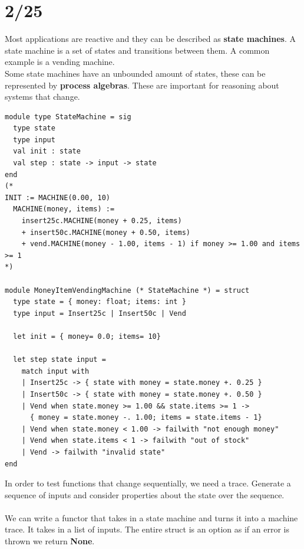 \section{2/25}
Most applications are reactive and they can be described as \textbf{state machines}. A state machine is a set of states and transitions between them. A common example is a vending machine.
\\
Some state machines have an unbounded amount of states, these can be represented by \textbf{process algebras}. These are important for reasoning about systems that change.
\begin{lstlisting}
module type StateMachine = sig
  type state
  type input
  val init : state
  val step : state -> input -> state
end
(* 
INIT := MACHINE(0.00, 10)
  MACHINE(money, items) :=
    insert25c.MACHINE(money + 0.25, items)
    + insert50c.MACHINE(money + 0.50, items)
    + vend.MACHINE(money - 1.00, items - 1) if money >= 1.00 and items >= 1
*)

module MoneyItemVendingMachine (* StateMachine *) = struct
  type state = { money: float; items: int }
  type input = Insert25c | Insert50c | Vend

  let init = { money= 0.0; items= 10}
  
  let step state input = 
    match input with
    | Insert25c -> { state with money = state.money +. 0.25 }
    | Insert50c -> { state with money = state.money +. 0.50 }
    | Vend when state.money >= 1.00 && state.items >= 1 -> 
      { money = state.money -. 1.00; items = state.items - 1}
    | Vend when state.money < 1.00 -> failwith "not enough money"
    | Vend when state.items < 1 -> failwith "out of stock"
    | Vend -> failwith "invalid state"
end
\end{lstlisting}
In order to test functions that change sequentially, we need a trace. Generate a sequence of inputs and consider properties about the state over the sequence.
\\\\
We can write a functor that takes in a state machine and turns it into a machine trace. It takes in a list of inputs. The entire struct is an option as if an error is thrown we return \textbf{None}.